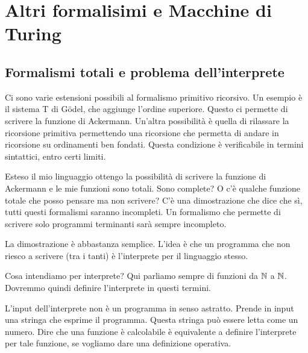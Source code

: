 %
%
%
%
\chapter{Altri formalisimi e Macchine di Turing}

\section{Formalismi totali e problema dell'interprete}

Ci sono varie estensioni possibili al formalismo primitivo ricorsivo. Un esempio è il sistema T di
Gödel, che aggiunge l'ordine superiore. Questo ci permette di scrivere la funzione di Ackermann.
Un'altra possibilità è quella di rilassare la ricorsione primitiva permettendo una ricorsione che
permetta di andare in ricorsione su ordinamenti ben fondati. Questa condizione è verificabile in
termini sintattici, entro certi limiti.

Esteso il mio linguaggio ottengo la possibilità di scrivere la funzione di Ackermann e le mie
funzioni sono totali. Sono complete? O c'è qualche funzione totale che posso pensare ma non
scrivere? C'è una dimostrazione che dice che sì, tutti questi formalismi saranno incompleti. Un
formalismo che permette di scrivere solo programmi terminanti sarà sempre incompleto.

La dimostrazione è abbastanza semplice. L'idea è che un programma che non riesco a scrivere (tra
i tanti) è l'interprete per il linguaggio stesso. 

Cosa intendiamo per interprete? Qui parliamo sempre di funzioni da $\mathbb{N}$ a $\mathbb{N}$. Dovremmo quindi
definire l'interprete in questi termini.

L'input dell'interprete non è un programma in senso astratto. Prende in input una stringa che
esprime il programma. Questa stringa può essere letta come un numero. Dire che una funzione è
calcolabile è equivalente a definire l'interprete per tale funzione, se vogliamo dare una
definizione operativa.

